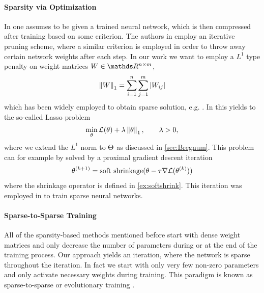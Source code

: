 \paragraph{Sparsity via Optimization} In \cite{lecun1989optimal, hassibi1993optimal} one assumes to be given a trained neural network, which is then compressed after training based on some criterion. The authors in \cite{castellano1997iterative} employ an iterative pruning scheme, where a similar criterion is employed in order to throw away certain network weights after each step. In our work we want to employ a $L^1$ type penalty on weight matrices $W\in\R^{n\times m}$,
%
\begin{align*}
\left\|W\right\|_1 = \sum_{i=1}^n\sum_{j=1}^m \left|W_{ij}\right|
\end{align*}
%
which has been widely employed to obtain sparse solution, e.g. \cite{claerbout1973robust}. In \cite{tibshirani1996regression} this yields to the so-called Lasso problem
%
\begin{align*}
\min_\theta \mathcal{L}(\theta) + \lambda \left\|\theta\right\|_1,\qquad \lambda >0,
\end{align*}
%
where we extend the $L^1$ norm to $\Theta$ as discussed in \cref{sec:Bregnum}. This problem can for example by solved by a proximal gradient descent iteration
%
\begin{align}\label{eq:proxgd}
\theta^{(k+1)} = \operatorname{soft\ shrinkage}(\theta - \tau \nabla\mathcal{L}(\theta^{(k)}))
\end{align}
%
where the shrinkage operator is defined in \cref{ex:softshrink}. This iteration was employed in \cite{nitanda2014stochastic, rosasco2014convergence, reddi2016proximal} to train sparse neural networks.
%
%
\paragraph{Sparse-to-Sparse Training} All of the sparsity-based methods mentioned before start with dense weight matrices and only decrease the number of parameters during or at the end of the training process. Our approach yields an iteration, where the network is sparse throughout the iteration. In fact we start with only very few non-zero parameters and only activate necessary weights during training. This paradigm is known as sparse-to-sparse or evolutionary training \cite{mocanu2018scalable, dettmers2019sparse, Evci2020, dai2019nest, fu2019exploring, huang2016split, liu2021}.
%
%
